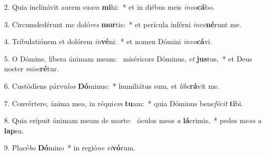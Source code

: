 2. Quia inclinávit aurem su\textit{am} \textbf{mi}hi:~*  et in diébus meis \textit{in}\textit{vo}\textbf{cá}bo.\

3. Circumdedérunt me doló\textit{res} \textbf{mor}tis:~*  et perícula inférni \textit{in}\textit{ve}\textbf{né}runt me.\

4. Tribulatiónem et dolórem \textit{in}\textbf{vé}ni:~*  et nomen Dómini \textit{in}\textit{vo}\textbf{cá}vi.\

5. O Dómine, líbera ánimam meam: \dag\  miséricors Dóminus, \textit{et} \textbf{jus}tus,~*  et Deus noster \textit{mi}\textit{se}\textbf{ré}tur.\

6. Custódiens párvu\textit{los} \textbf{Dó}minus:~*  humiliátus sum, et \textit{li}\textit{be}\textbf{rá}vit me.\

7. Convértere, ánima mea, in réqui\textit{em} \textbf{tu}am:~*  quia Dóminus bene\textit{fé}\textit{cit} \textbf{ti}bi.\

8. Quia erípuit ánimam meam de morte: \dag\  óculos meos \textit{a} \textbf{lá}crimis,~*  pedes me\textit{os} \textit{a} \textbf{lap}su.\

9. Placé\textit{bo} \textbf{Dó}mino~*  in regió\textit{ne} \textit{vi}\textbf{vó}rum.\


